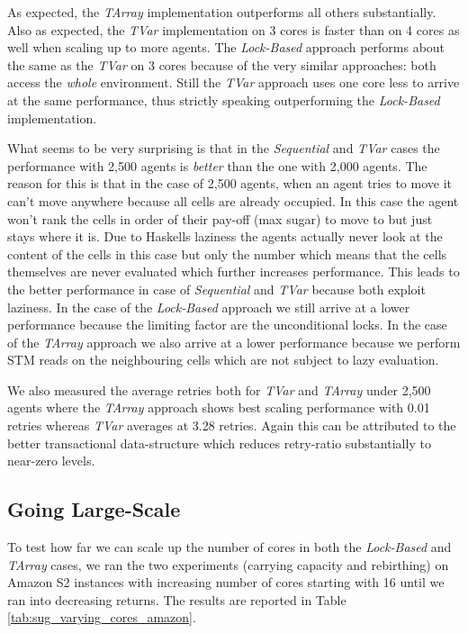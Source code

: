 As expected, the \textit{TArray} implementation outperforms all others substantially. Also as expected, the \textit{TVar} implementation on 3 cores is faster than on 4 cores as well when scaling up to more agents. The \textit{Lock-Based} approach performs about the same as the \textit{TVar} on 3 cores because of the very similar approaches: both access the \textit{whole} environment. Still the \textit{TVar} approach uses one core less to arrive at the same performance, thus strictly speaking outperforming the \textit{Lock-Based} implementation.

What seems to be very surprising is that in the \textit{Sequential} and \textit{TVar} cases the performance with 2,500 agents is \textit{better} than the one with 2,000 agents. The reason for this is that in the case of 2,500 agents, when an agent tries to move it can't move anywhere because all cells are already occupied. In this case the agent won't rank the cells in order of their pay-off (max sugar) to move to but just stays where it is.  Due to Haskells laziness the agents actually never look at the content of the cells in this case but only the number which means that the cells themselves are never evaluated which further increases performance. This leads to the better performance in case of \textit{Sequential} and \textit{TVar} because both exploit laziness.
In the case of the \textit{Lock-Based} approach we still arrive at a lower performance because the limiting factor are the unconditional locks. In the case of the \textit{TArray} approach we also arrive at a lower performance because we perform STM reads on the neighbouring cells which are not subject to lazy evaluation.

We also measured the average retries both for \textit{TVar} and \textit{TArray} under 2,500 agents where the \textit{TArray} approach shows best scaling performance with 0.01 retries whereas \textit{TVar} averages at 3.28 retries. Again this can be attributed to the better transactional data-structure which reduces retry-ratio substantially to near-zero levels.

\subsection{Going Large-Scale}
To test how far we can scale up the number of cores in both the \textit{Lock-Based} and \textit{TArray} cases, we ran the two experiments (carrying capacity and rebirthing) on Amazon S2 instances with increasing number of cores starting with 16 until we ran into decreasing returns. The results are reported in Table \ref{tab:sug_varying_cores_amazon}.

